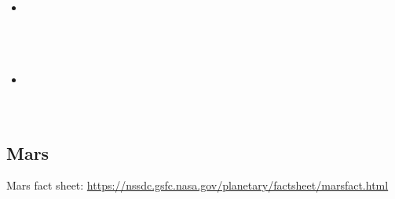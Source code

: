 \begin{scriptsize}
\begin{itemize}
\item[\twothousandtwentytwo]
 \\
 \\
 \\
 \\
\item[\twothousandtwentythree]
 \\
 \\
 \\
\end{itemize}
\end{scriptsize}


\subsection{Mars}

Mars fact sheet: \url{https://nssdc.gsfc.nasa.gov/planetary/factsheet/marsfact.html}

